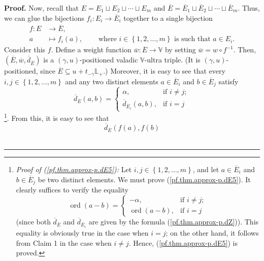 \documentclass[numbers=enddot,12pt,final,onecolumn,notitlepage]{scrartcl}%
\theoremstyle{definition}
\newenvironment{proof}[1][Proof]{\noindent\textbf{#1.} }{\ \rule{0.5em}{0.5em}}
\theoremstyle{plainsl}
\begin{document}
\begin{proof}
Now, recall that $E=E_{1}\sqcup E_{2}\sqcup\cdots\sqcup E_{m}$ and
$\overline{E}=\overline{E}_{1}\sqcup\overline{E}_{2}\sqcup\cdots
\sqcup\overline{E}_{m}$. Thus, we can glue the bijections $f_{i}%
:E_{i}\rightarrow\overline{E}_{i}$ together to a single bijection%
\begin{align*}
f:E  &  \rightarrow\overline{E},\\
a  &  \mapsto f_{i}\left(  a\right)  ,\ \ \ \ \ \ \ \ \ \ \text{where }%
i\in\left\{  1,2,\ldots,m\right\}  \text{ is such that }a\in E_{i}.
\end{align*}
Consider this $f$. Define a weight function $\overline{w}:\overline
{E}\rightarrow\mathbb{V}$ by setting $\overline{w}=w\circ f^{-1}$. Then,
$\left(  \overline{E},\overline{w},\overline{d}_{\overline{E}}\right)  $ is a
$\left(  \gamma,u\right)  $-positioned valadic $\mathbb{V}$-ultra triple. (It
is $\left(  \gamma,u\right)  $-positioned, since $\overline{E}\subseteq
u+t_{-\gamma}\mathbb{L}_{+}$.) Moreover, it is easy to see that every
$i,j\in\left\{  1,2,\ldots,m\right\}  $ and any two distinct elements
$a\in\overline{E}_{i}$ and $b\in\overline{E}_{j}$ satisfy%
\begin{equation}
\overline{d}_{\overline{E}}\left(  a,b\right)  =%
\begin{cases}
\alpha, & \text{if }i\neq j;\\
\overline{d}_{\overline{E}_{i}}\left(  a,b\right)  , & \text{if }i=j
\end{cases}
\label{pf.thm.approx-p.dE5}%
\end{equation}
\footnote{\textit{Proof of (\ref{pf.thm.approx-p.dE5}):} Let $i,j\in\left\{
1,2,\ldots,m\right\}  $, and let $a\in\overline{E}_{i}$ and $b\in\overline
{E}_{j}$ be two distinct elements. We must prove (\ref{pf.thm.approx-p.dE5}).
It clearly suffices to verify the equality
\[
\operatorname*{ord}\left(  a-b\right)  =%
\begin{cases}
-\alpha, & \text{if }i\neq j;\\
\operatorname*{ord}\left(  a-b\right)  , & \text{if }i=j
\end{cases}
\]
(since both $\overline{d}_{\overline{E}}$ and $\overline{d}_{\overline{E}_{i}%
}$ are given by the formula (\ref{pf.thm.approx-p.dZ})). This equality is
obviously true in the case when $i=j$; on the other hand, it follows from
Claim 1 in the case when $i\neq j$. Hence, (\ref{pf.thm.approx-p.dE5}) is
proved.}. From this, it is easy to see that%
\begin{equation}
\overline{d}_{\overline{E}}\left(  f\left(  a\right)  ,f\left(  b\right)

\end{equation}
\end{proof}
\end{document}
